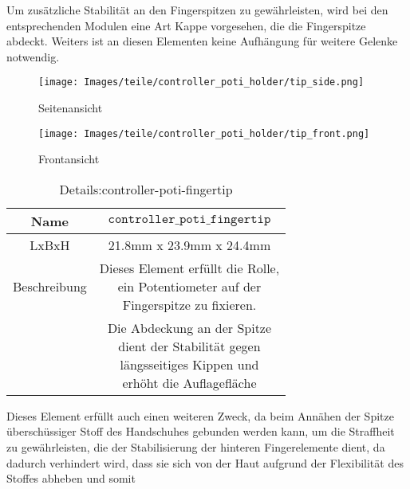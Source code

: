 Um zusätzliche Stabilität an den Fingerspitzen zu gewährleisten, wird bei den entsprechenden Modulen eine Art Kappe vorgesehen, die die Fingerspitze abdeckt. 
Weiters ist an diesen Elementen keine Aufhängung für weitere Gelenke notwendig. 
\begin{minipage}{0.5\textwidth}
    \begin{figure}[H]
        \texttt{[image: Images/teile/controller\_poti\_holder/tip\_side.png]}
        \centering
        \caption{Seitenansicht}
    \end{figure}
\end{minipage}
\begin{minipage}{0.5\textwidth}
    \begin{figure}[H]
        \texttt{[image: Images/teile/controller\_poti\_holder/tip\_front.png]}
        \centering
        \caption{Frontansicht}
    \end{figure}
\end{minipage}
\begin{minipage}{0.6\textwidth}
    \begin{table}[H]
        \centering
        \begin{tabular}{|c|c|}
            \hline
            Name&$\texttt{controller}\_ \texttt{poti}\_\texttt{fingertip}$\\
            \hline
            LxBxH&21.8mm x 23.9mm x 24.4mm\\
            \hline
            Beschreibung&\shortstack{Dieses Element erfüllt die Rolle, \\ein Potentiometer auf der \\Fingerspitze zu fixieren.}\\
            &\shortstack{Die Abdeckung an der Spitze\\ dient der Stabilität gegen\\längsseitiges Kippen und\\erhöht die Auflagefläche}\\
            \hline
        \end{tabular} 
        \caption{Details:controller-poti-fingertip}
        \label{tab:test}
    \end{table}
    
\end{minipage}
\begin{minipage}{0.4\textwidth}
    Dieses Element erfüllt auch einen weiteren Zweck, da beim Annähen der Spitze überschüssiger Stoff des Handschuhes 
    gebunden werden kann, um die Straffheit zu gewährleisten, die der Stabilisierung der hinteren Fingerelemente dient, da 
    dadurch verhindert wird, dass sie sich von der Haut aufgrund der Flexibilität des Stoffes abheben und somit 
\end{minipage}


